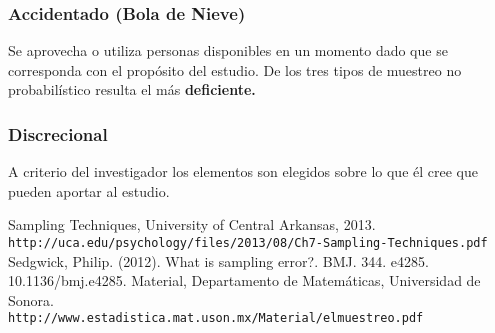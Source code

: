 \documentclass[10pt,letterpaper]{article}
\begin{document}
\subsubsection{Accidentado (Bola de Nieve)}
Se aprovecha o utiliza personas disponibles en un momento
dado que se corresponda con el propósito del estudio.
De los tres tipos de muestreo no probabilístico resulta el más
\textbf{deficiente.}
\subsubsection{Discrecional}
A criterio del investigador los elementos son elegidos sobre lo que él cree que pueden aportar al estudio.

\begin{thebibliography}{9}
Sampling Techniques, University of Central Arkansas, 2013. \\\texttt{http://uca.edu/psychology/files/2013/08/Ch7-Sampling-Techniques.pdf}
Sedgwick, Philip. (2012). What is sampling error?. BMJ. 344. e4285. 10.1136/bmj.e4285. 
Material, Departamento de Matemáticas, Universidad de Sonora.\\\texttt{http://www.estadistica.mat.uson.mx/Material/elmuestreo.pdf}

\end{thebibliography}
\end{document}
